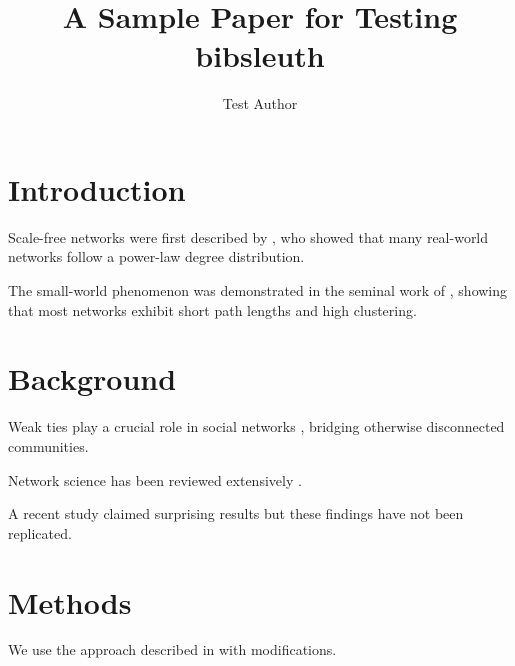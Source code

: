 \documentclass{article}
\title{A Sample Paper for Testing bibsleuth}
\author{Test Author}
\begin{document}
\maketitle

\section{Introduction}

Scale-free networks were first described by \cite{barabasi1999emergence}, who showed
that many real-world networks follow a power-law degree distribution.

The small-world phenomenon was demonstrated in the seminal work of
\citet{watts1998collective}, showing that most networks exhibit short path lengths
and high clustering.


\section{Background}

Weak ties play a crucial role in social networks \citep{granovetter1973strength},
bridging otherwise disconnected communities.

Network science has been reviewed extensively \cite{newman2003structure,barabasi1999emergence}.

A recent study claimed surprising results \cite{fake2024nonexistent} but these
findings have not been replicated.

\section{Methods}

We use the approach described in \autocite{watts1998collective} with modifications.



\end{document}
